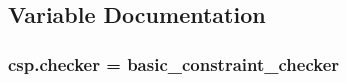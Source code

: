 \subsection{Variable Documentation}
\hypertarget{namespacecsp_a521f09aff5d0f231d9cf34d594c9fad1}{}
\subsubsection[{checker}]{\setlength{\rightskip}{0pt plus 5cm}csp.\+checker = {\bf basic\+\_\+constraint\+\_\+checker}}\label{namespacecsp_a521f09aff5d0f231d9cf34d594c9fad1}
